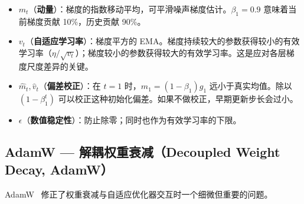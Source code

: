 \newpage
\begin{intuitionbox}[每一项的作用]
\begin{itemize}
  \item $m_t$（\textbf{动量}）：梯度的指数移动平均，可平滑噪声梯度估计。$\beta_1 = 0.9$ 意味着当前梯度贡献 10\%，历史贡献 90\%。
  \item $v_t$（\textbf{自适应学习率}）：梯度平方的 EMA。梯度持续较大的参数获得较小的有效学习率（$\eta / \sqrt{v_t}$）；梯度较小的参数获得较大的有效学习率。这是应对各层梯度尺度差异的关键。
  \item $\hat{m}_t, \hat{v}_t$（\textbf{偏差校正}）：在 $t=1$ 时，$m_1 = (1-\beta_1)g_1$ 远小于真实均值。除以 $(1-\beta_1^t)$ 可以校正这种初始化偏差。如果不做校正，早期更新步长会过小。
  \item $\epsilon$（\textbf{数值稳定性}）：防止除零；同时也作为有效学习率的下限。
\end{itemize}
\end{intuitionbox}

\subsection{AdamW --- 解耦权重衰减（Decoupled Weight Decay, AdamW）}
\label{adamw-decoupled-weight-decay}

AdamW~\cite{loshchilov2019adamw} 修正了权重衰减与自适应优化器交互时一个细微但重要的问题。

